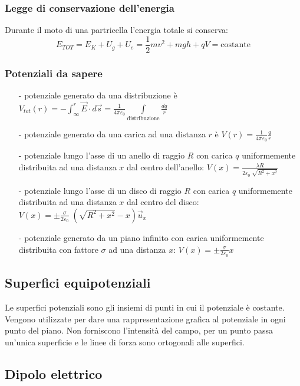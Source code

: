 \documentclass[a4paper]{article}
\newcommand\ux{\vec{u}_x}
\begin{document}
\subsubsection*{Legge di conservazione dell'energia}
Durante il moto di una partricella l'energia totale si conserva:
\[E_{TOT} = E_K + U_g + U_e = \frac{1}{2} mv^2 + mgh + qV = \text{costante}\]

\subsubsection*{Potenziali da sapere}
\begin{itemize}[topsep=3pt, itemsep=0pt]
	\item[-] potenziale generato da una distribuzione è \(\displaystyle V_{tot}(r) = -\int_{\infty}^r \vec{E} \cdot d\vec{s} = \frac{1}{4 \pi \varepsilon_0} \int \limits_\text{distribuzione} \frac{dq}{r}\)
	\item[-] potenziale generato da una carica ad una distanza \(r\) è \(\displaystyle V(r) = \frac{1}{4 \pi \varepsilon_0} \frac{q}{r}\)
	\item[-] potenziale lungo l'asse di un anello di raggio \(R\) con carica \(q\) uniformemente distribuita ad una distanza
	\(x\) dal centro dell'anello: \(\displaystyle V(x) = \frac{\lambda R}{2 \varepsilon_0 \; \sqrt{R^2 + x^2}}\)
	\item[-] potenziale lungo l'asse di un disco di raggio \(R\) con carica \(q\) uniformemente distribuita ad una distanza
	\(x\) dal centro del disco: \(\displaystyle V(x) = \pm \frac{\sigma}{2 \varepsilon_0} \; \left(\sqrt{R^2 + x^2} - x\right) \ux\)
	\item[-] potenziale generato da un piano infinito con carica uniformemente distribuita con fattore \(\sigma\) ad una distanza \(x\):
	\(\displaystyle V(x) = \pm \frac{\sigma}{2 \varepsilon_0} x\)
\end{itemize}

\subsection{Superfici equipotenziali}
Le superfici potenziali sono gli insiemi di punti in cui il potenziale è costante. Vengono utilizzate per dare una rappresentazione
grafica al potenziale in ogni punto del piano. Non forniscono l'intensità del campo, per un punto passa un'unica superficie e le
linee di forza sono ortogonali alle superfici.

\subsection{Dipolo elettrico}
\end{document}
